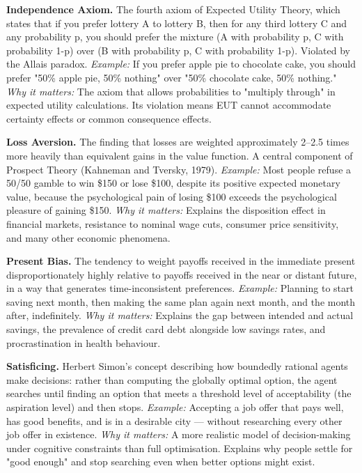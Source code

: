 \documentclass[12pt, letterpaper]{article}
\begin{document}
\textbf{Independence Axiom.} The fourth axiom of Expected Utility Theory, which states that if you prefer lottery A to lottery B, then for any third lottery C and any probability p, you should prefer the mixture (A with probability p, C with probability 1-p) over (B with probability p, C with probability 1-p). Violated by the Allais paradox. \textit{Example:} If you prefer apple pie to chocolate cake, you should prefer "50\% apple pie, 50\% nothing" over "50\% chocolate cake, 50\% nothing." \textit{Why it matters:} The axiom that allows probabilities to "multiply through" in expected utility calculations. Its violation means EUT cannot accommodate certainty effects or common consequence effects.

\textbf{Loss Aversion.} The finding that losses are weighted approximately 2--2.5 times more heavily than equivalent gains in the value function. A central component of Prospect Theory (Kahneman and Tversky, 1979). \textit{Example:} Most people refuse a 50/50 gamble to win \$150 or lose \$100, despite its positive expected monetary value, because the psychological pain of losing \$100 exceeds the psychological pleasure of gaining \$150. \textit{Why it matters:} Explains the disposition effect in financial markets, resistance to nominal wage cuts, consumer price sensitivity, and many other economic phenomena.

\textbf{Present Bias.} The tendency to weight payoffs received in the immediate present disproportionately highly relative to payoffs received in the near or distant future, in a way that generates time-inconsistent preferences. \textit{Example:} Planning to start saving next month, then making the same plan again next month, and the month after, indefinitely. \textit{Why it matters:} Explains the gap between intended and actual savings, the prevalence of credit card debt alongside low savings rates, and procrastination in health behaviour.

\textbf{Satisficing.} Herbert Simon's concept describing how boundedly rational agents make decisions: rather than computing the globally optimal option, the agent searches until finding an option that meets a threshold level of acceptability (the aspiration level) and then stops. \textit{Example:} Accepting a job offer that pays well, has good benefits, and is in a desirable city --- without researching every other job offer in existence. \textit{Why it matters:} A more realistic model of decision-making under cognitive constraints than full optimisation. Explains why people settle for "good enough" and stop searching even when better options might exist.
\end{document}
